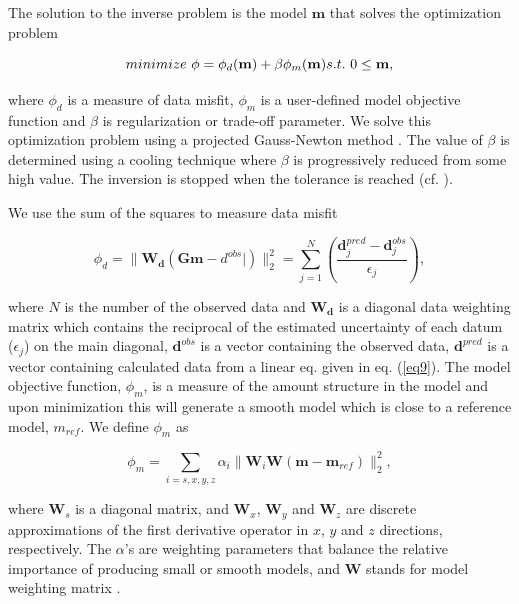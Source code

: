 \documentclass[letterpaper,11pt]{article}
\begin{document}
The solution to the inverse problem is the model $\mathbf{m}$ that solves the optimization problem
\begin{linenomath*}
\begin{equation}
  minimize \ \phi =  \phi_d(\mathbf{m}) + \beta\phi_m(\mathbf{m}) \\
  s.t. \ 0 \le \mathbf{m},
  \label{eq10}
\end{equation}
\end{linenomath*}
where $\phi_d$ is a measure of data misfit, $\phi_m$ is a user-defined model objective function and $\beta$ is regularization or trade-off parameter. We solve this optimization problem using a projected Gauss-Newton method \cite[]{Kelley}. 
The value of $\beta$ is determined using a cooling technique where $\beta$ is progressively reduced from some high value. The inversion is stopped when the tolerance is reached (cf. \cite{DougTutorial, Kang2014}). 

We use the sum of the squares to measure data misfit
\begin{linenomath*}
\begin{equation}
  \phi_d = \| \mathbf{W_d}(\mathbf{G}\mathbf{m}-d^{obs}|)\|^2_2 =
  \sum^N_{j=1}(\frac{\mathbf{d}^{pred}_j-\mathbf{d}^{obs}_j}{\epsilon_j}),
  \label{eq11}
\end{equation}
\end{linenomath*}
where $N$ is the number of the observed data and $\mathbf{W_d}$ is a diagonal data weighting matrix which contains the reciprocal of the estimated uncertainty of each datum ($\epsilon_j$) on the main diagonal,  $\mathbf{d}^{obs}$ is a vector containing the observed data, $\mathbf{d}^{pred}$ is a vector containing calculated data from a linear eq. given in eq. (\ref{eq9}).
The model objective function, $\phi_m$, is a measure of the amount structure in the model and upon minimization this will generate a smooth model which is close to a reference model, $m_{ref}$. 
We define $\phi_m$ as
\begin{linenomath*}
\begin{equation}
  \phi_m = \sum_{i=s,x,y,z} \alpha_i\| \mathbf{W}_i\mathbf{W}(\mathbf{m}-\mathbf{m}_{ref})\|^2_2,
  \label{eq12}
\end{equation}
\end{linenomath*}
where $\mathbf{W}_s$ is a diagonal matrix, and $\mathbf{W}_x$, $\mathbf{W}_y$ and $\mathbf{W}_z$ are discrete approximations of the first derivative operator in $x$, $y$ and $z$ directions, respectively.  
The $\alpha$'s are weighting parameters that balance the relative importance of producing small or smooth models, and $\mathbf{W}$ stands for model weighting matrix \cite[]{LiMag3D}.
\end{document}

